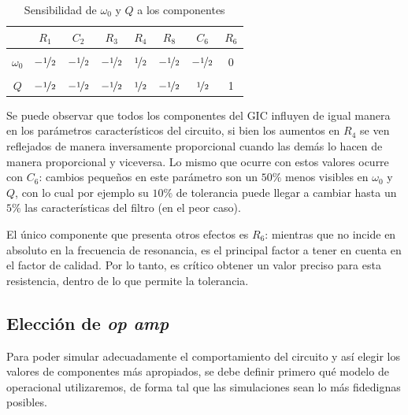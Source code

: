 \documentclass[../../tc_tp3_main.tex]{subfiles}
\begin{document}
\begin{table}[H]
	\centering
	\begin{tabular}{|c||c|c|c|c|c|c|c|}
		\hline
		\backslashbox{$y$}{$x$} & $R_1$          & $C_2$          & $R_3$          & $R_4$         & $R_8$          & $C_6$          & $R_6$ \\ \hline\hline
		\\[-1em]
		$\omega_0$                                 & $-\nicefrac{1}{2}$ & $-\nicefrac{1}{2}$ & $-\nicefrac{1}{2}$ & $\nicefrac{1}{2}$ & $-\nicefrac{1}{2}$ & $-\nicefrac{1}{2}$ & 0     \\ \hline
		\\[-1em]
		$Q$                                        & $-\nicefrac{1}{2}$ & $-\nicefrac{1}{2}$ & $-\nicefrac{1}{2}$ & $\nicefrac{1}{2}$ & $-\nicefrac{1}{2}$ & $\nicefrac{1}{2}$  & 1     \\ \hline
	\end{tabular}
	\caption{Sensibilidad de $\omega_0$ y $Q$ a los componentes}
\end{table} 

Se puede observar que todos los componentes del GIC influyen de igual manera en los par\'ametros caracter\'isticos del circuito, si bien los aumentos en $R_4$ se ven reflejados de manera inversamente proporcional cuando las dem\'as lo hacen de manera proporcional y viceversa. Lo mismo que ocurre con estos valores ocurre con $C_6$: cambios peque\~nos en este par\'ametro son un $50\%$ menos visibles en $\omega_0$ y $Q$, con lo cual por ejemplo su $10\%$ de tolerancia puede llegar a cambiar hasta un $5\%$ las caracter\'isticas del filtro (en el peor caso).\par 

El \'unico componente que presenta otros efectos es $R_6$: mientras que no incide en absoluto en la frecuencia de resonancia, es el principal factor a tener en cuenta en el factor de calidad. Por lo tanto, es cr\'itico obtener un valor preciso para esta resistencia, dentro de lo que permite la tolerancia.  


\subsection{Elecci\'on de \textit{op amp}}

Para poder simular adecuadamente el comportamiento del circuito y as\'i elegir los valores de componentes m\'as apropiados, se debe definir primero qu\'e modelo de operacional utilizaremos, de forma tal que las simulaciones sean lo m\'as fidedignas posibles.\par
\end{document}
